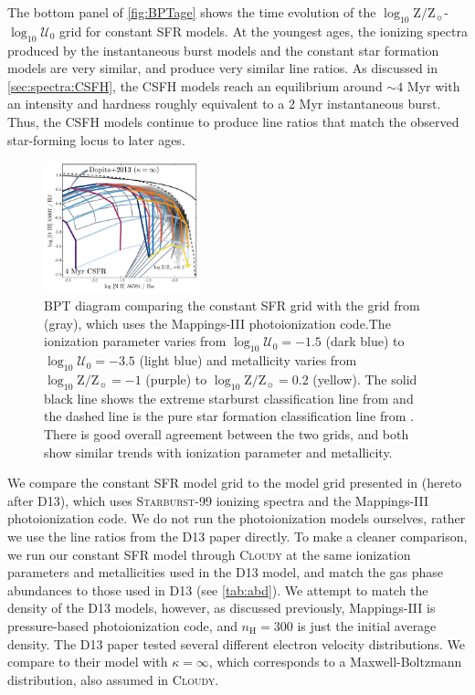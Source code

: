 \documentclass[twocolumn, tighten]{aastex61}
\newcommand{\Fig}[1]{\autoref{fig:#1}}
\newcommand{\Sec}[1]{\autoref{sec:#1}}
\newcommand{\Tab}[1]{\autoref{tab:#1}}
\newcommand{\Mappings}{{\sc Mappings-III}\xspace}
\newcommand{\SB}{\textsc{Starburst-99}\xspace}
\newcommand{\Cloudy}{\textsc{Cloudy}\xspace}
\newcommand{\logten}{\ensuremath{\log_{10}}}
\newcommand{\nH}{\ensuremath{n_{\mathrm{H}}}}
\newcommand{\logz}{\ensuremath{\logten \mathrm{Z}/\mathrm{Z}_{\sun}}}
\newcommand{\logZeq}[1]{\ensuremath{\logten \mathrm{Z}/\mathrm{Z}_{\sun} = #1}}
\newcommand{\logU}{\ensuremath{\logten \mathcal{U}_0}}
\begin{document}
The bottom panel of \Fig{BPTage} shows the time evolution of the \logz{}-\logU{} grid for constant SFR models. At the youngest ages, the ionizing spectra produced by the instantaneous burst models and the constant star formation models are very similar, and produce very similar line ratios. As discussed in \Sec{spectra:CSFH}, the CSFH models reach an equilibrium around $\sim4$ Myr with an intensity and hardness roughly equivalent to a 2 Myr instantaneous burst. Thus, the CSFH models continue to produce line ratios that match the observed star-forming locus to later ages.
\begin{figure} [h!]
  \begin{centering}
    \includegraphics[width=0.4\textwidth]{f17.pdf}
    \caption{BPT diagram comparing the constant SFR grid with the grid from \citet{Dopita13} (gray), which uses the \Mappings photoionization code.The ionization parameter varies from $\logU=-1.5$ (dark blue) to $\logU=-3.5$ (light blue) and metallicity varies from \logZeq{-1} (purple) to \logZeq{0.2} (yellow). The solid black line shows the extreme starburst classification line from \citet{Kewley01} and the dashed line is the pure star formation classification line from \citet{Kauffmann03a}. There is good overall agreement between the two grids, and both show similar trends with ionization parameter and metallicity.}
    \label{fig:CSFHdop}
  \end{centering}
\end{figure}

We compare the constant SFR model grid to the model grid presented in \citet{Dopita13} (hereto after D13), which uses \SB{} ionizing spectra and the \Mappings photoionization code. We do not run the photoionization models ourselves, rather we use the line ratios from the D13 paper directly. To make a cleaner comparison, we run our constant SFR model through \Cloudy at the same ionization parameters and metallicities used in the D13 model, and match the gas phase abundances to those used in D13 (see \Tab{abd}). We attempt to match the density of the D13 models, however, as discussed previously, \Mappings is pressure-based photoionization code, and $\nH=300$ is just the initial average density. The D13 paper tested several different electron velocity distributions. We compare to their model with $\kappa=\infty$, which corresponds to a Maxwell-Boltzmann distribution, also assumed in \Cloudy.
\end{document}
